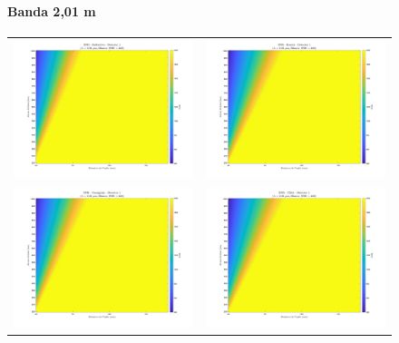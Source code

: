 \begin{landscape}
\begin{figure}[p]
\centering
\setlength{\tabcolsep}{2pt}
\renewcommand{\arraystretch}{0}

\paragraph{Banda 2,01 \textmu m}
\begin{tabular}{cc}
\includegraphics[width=0.48\linewidth]{4.Payload/SNR/SNR_Lambda2_Detector1_Telescopio1_heatmap.jpg} &
\includegraphics[width=0.48\linewidth]{4.Payload/SNR/SNR_Lambda2_Detector1_Telescopio2_heatmap.jpg} \\
\includegraphics[width=0.48\linewidth]{4.Payload/SNR/SNR_Lambda2_Detector1_Telescopio3_heatmap.jpg} &
\includegraphics[width=0.48\linewidth]{4.Payload/SNR/SNR_Lambda2_Detector1_Telescopio4_heatmap.jpg} \\

\end{tabular}
\end{figure}
\end{landscape}
